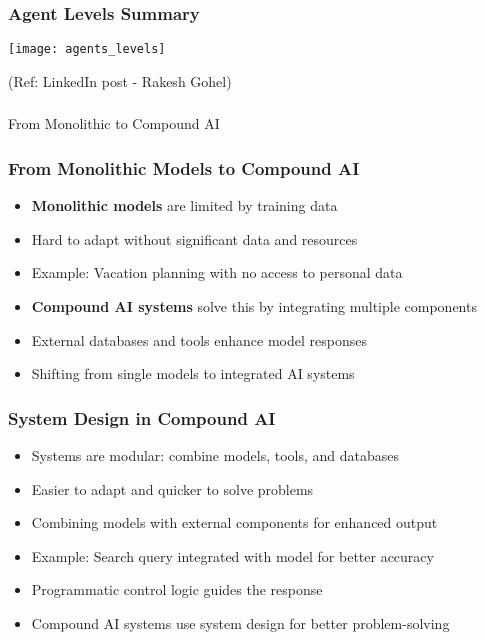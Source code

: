 \begin{frame}[fragile]\frametitle{Agent Levels Summary}
\begin{center}
\texttt{[image: agents\_levels]}
\end{center}

{\tiny (Ref: LinkedIn post - Rakesh Gohel)}
\end{frame}

\begin{frame}[fragile]\frametitle{}
\begin{center}
{\Large From Monolithic to Compound AI}
\end{center}
\end{frame}

\begin{frame}[fragile]\frametitle{From Monolithic Models to Compound AI}
\begin{itemize}
    \item \textbf{Monolithic models} are limited by training data
    \item Hard to adapt without significant data and resources
    \item Example: Vacation planning with no access to personal data
    \item \textbf{Compound AI systems} solve this by integrating multiple components
    \item External databases and tools enhance model responses
    \item Shifting from single models to integrated AI systems
\end{itemize}
\end{frame}

\begin{frame}[fragile]\frametitle{System Design in Compound AI}
\begin{itemize}
    \item Systems are modular: combine models, tools, and databases
    \item Easier to adapt and quicker to solve problems
    \item Combining models with external components for enhanced output
    \item Example: Search query integrated with model for better accuracy
    \item Programmatic control logic guides the response
    \item Compound AI systems use system design for better problem-solving
\end{itemize}
\end{frame}

